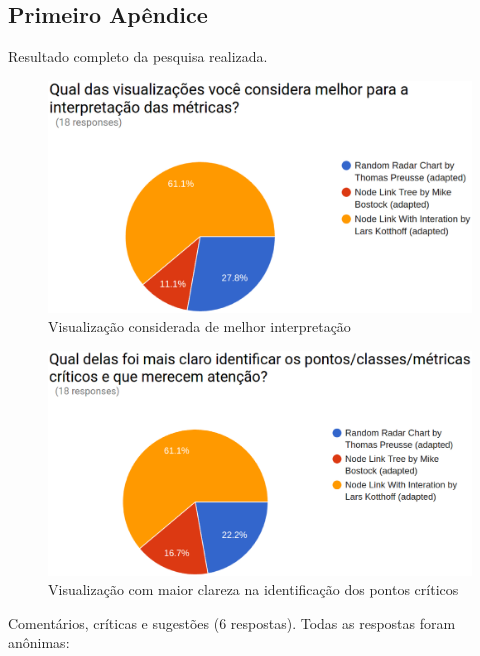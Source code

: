 \begin{apendicesenv}

\partapendices

\chapter{Primeiro Apêndice}
\label{chap:apendiceA}

Resultado completo da pesquisa realizada.

\begin{figure}[!htb]
	\centering
    \includegraphics[keepaspectratio=true,scale=0.35]
    {figuras/res1.eps}
  \caption{Visualização considerada de melhor interpretação}
  \label{fig:res1}
\end{figure}

\begin{figure}[!htb]
	\centering
    \includegraphics[keepaspectratio=true,scale=0.35]
    {figuras/res2.eps}
  \caption{Visualização com maior clareza na identificação dos pontos críticos}
  \label{fig:res2}
\end{figure}

Comentários, críticas e sugestões (6 respostas). Todas as respostas foram
anônimas:


\end{apendicesenv}
